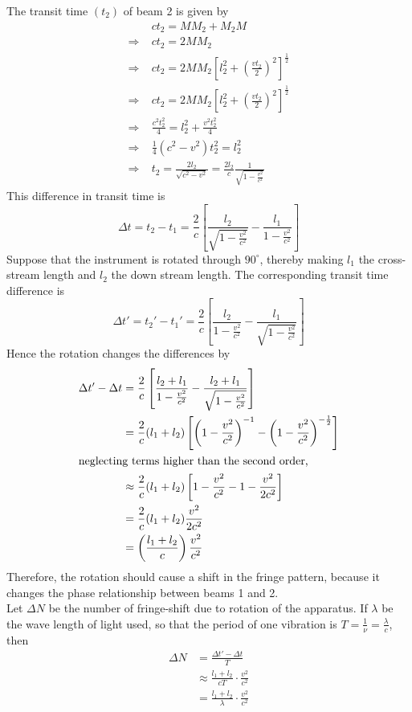 \documentclass[../main-sheet.tex]{subfiles}
\begin{document}
The transit time \((t_2)\) of beam 2 is given by
\begin{align*}
    &ct_2=MM_2+M_2M\\
    \Rightarrow\;&ct_2=2MM_2\\
    \Rightarrow\;&ct_2=2MM_2\left[ l_2^2+\left( \frac{vt_2}{2} \right)^2 \right]^{\frac{1}{2}}\\
    \Rightarrow\;&ct_2=2MM_2\left[ l_2^2+\left( \frac{vt_2}{2} \right)^2 \right]^{\frac{1}{2}}\\
    \Rightarrow\;&\frac{c^2t_2^2 }{4}=l_2^2+\frac{v^2t_2^2}{4}\\
    \Rightarrow\;&\frac{1}{4}(c^2-v^2)t_2^2=l_2^2\\
    \Rightarrow\;&t_2=\frac{2l_2}{\sqrt{c^2-v^2}}=\frac{2l_2}{c }\frac{1}{\sqrt{1-\frac{v^2 }{c^2 }}}
\end{align*}
This difference in transit time is
\[\Delta t=t_2-t_1=\frac{2}{c }\left[ \frac{l_2 }{\sqrt{1-\frac{v^2 }{c^2 }}}-\frac{l_1 }{1-\frac{v^2 }{c^2 }} \right]\]
Suppose that the instrument is rotated through \(90^\circ\), thereby making \(l_1\) the cross-stream length and \(l_2\) the down stream length. The corresponding transit time difference is 
\[\Delta t'=t_2'-t_1'=\frac{2}{c }\left[ \frac{l_2 }{1-\frac{v^2 }{c^2 }}-\frac{l_1 }{\sqrt{1-\frac{v^2 }{c^2 }}} \right]\]
Hence the rotation changes the differences by
\begin{align*}
    \Delta t'-\Delta t&=\frac{2}{c }\left[ \frac{l_2+l_1}{1-\frac{v^2}{c^2}}-\frac{l_2+l_1}{\sqrt{1-\frac{v^2}{c^2}}} \right]\\
    &=\frac{2}{c }(l_1+l_2)\left[ \left(1-\frac{v^2}{c^2}\right)^{-1}-\left(1-\frac{v^2}{c^2}\right)^{-\frac{1}{2}} \right]\\
    \intertext{neglecting terms higher than the second order,}
    &\approx \frac{2}{c }(l_1+l_2)\left[ 1-\frac{v^2}{c^2}-1-\frac{v^2}{2c^2}\right]\\
    &= \frac{2}{c }(l_1+l_2)\frac{v^2}{2c^2}\\
    &= \left(\frac{l_1+l_2}{c}\right)\frac{v^2}{c^2}
\end{align*}
Therefore, the rotation should cause a shift in the fringe pattern, because it changes the phase relationship between beams 1 and 2.\\
Let \(\Delta N \) be the number of fringe-shift due to rotation of the apparatus. If \(\lambda\) be the wave length of light used, so that the period of one vibration is \(T=\frac{1}{\nu}=\frac{\lambda}{c }\), then
\begin{align*}
    \Delta N&=\frac{\Delta t'-\Delta t }{T }\\
    &\approx \frac{l_1+l_2}{cT}\cdot\frac{v^2}{c^2}\\
    &= \frac{l_1+l_2}{\lambda}\cdot\frac{v^2}{c^2}
\end{align*}
\end{document}
